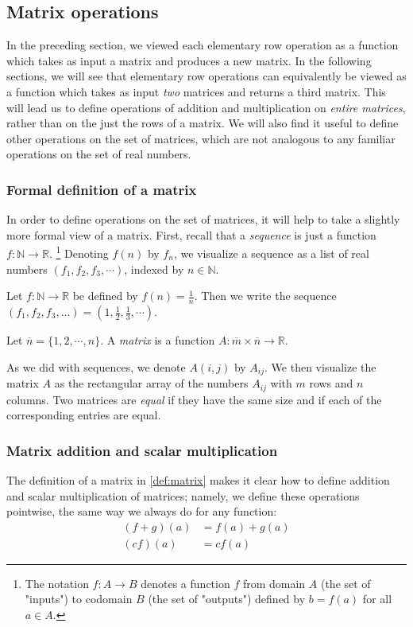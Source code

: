\documentclass[12pt,letterpaper,reqno]{article}
\numberwithin{equation}{section}
\begin{document}
\subsection{Matrix operations}
In the preceding section, we viewed each elementary row operation as a function which takes as input a matrix and produces a new matrix. In the following sections, we will see that elementary row operations can equivalently be viewed as a function which takes as input \emph{two} matrices and returns a third matrix. This will lead us to define operations of addition and multiplication on \emph{entire matrices}, rather than on the just the rows of a matrix. We will also find it useful to define other operations on the set of matrices, which are not analogous to any familiar operations on the set of real numbers.
\subsubsection{Formal definition of a matrix}
In order to define operations on the set of matrices, it will help to take a slightly more formal view of a matrix. First, recall that a \emph{sequence} is just a function $f:\mathbb{N} \to \mathbb{R}$. \footnote{The notation $f:A \to B$ denotes a function $f$ from domain $A$ (the set of "inputs") to codomain $B$ (the set of "outputs") defined by $b=f(a)$ for all $a \in A$.} Denoting $f(n)$ by $f_n$, we visualize a sequence as a list of real numbers $(f_1,f_2,f_3,\cdots)$, indexed by $n \in \mathbb{N}$.

\begin{example}
Let $f:\mathbb{N} \to \mathbb{R}$ be defined by $f(n)=\frac{1}{n}$. Then we write the sequence $(f_1,f_2,f_3,\dots)=(1,\frac{1}{2},\frac{1}{3},\cdots)$.	
\end{example}

\begin{defn}[Matrix]\label{def:matrix}
Let $\overline{n}=\{1,2,\cdots,n\}$. A \emph{matrix} is a function $A:\overline{m} \times \overline{n} \to \mathbb{R}$.	
\end{defn}

As we did with sequences, we denote $A(i,j)$ by $A_{ij}$. We then visualize the matrix $A$ as the rectangular array of the numbers $A_{ij}$ with $m$ rows and $n$ columns. Two matrices are \emph{equal} if they have the same size and if each of the corresponding entries are equal.


\subsubsection{Matrix addition and scalar multiplication}
The definition of a matrix in \ref{def:matrix} makes it clear how to define addition and scalar multiplication of matrices; namely, we define these operations pointwise, the same way we always do for any function: 
\begin{align*}
	(f+g)(a) &=f(a)+g(a) \\
	(cf)(a) &=cf(a) 
\end{align*}
\end{document}
